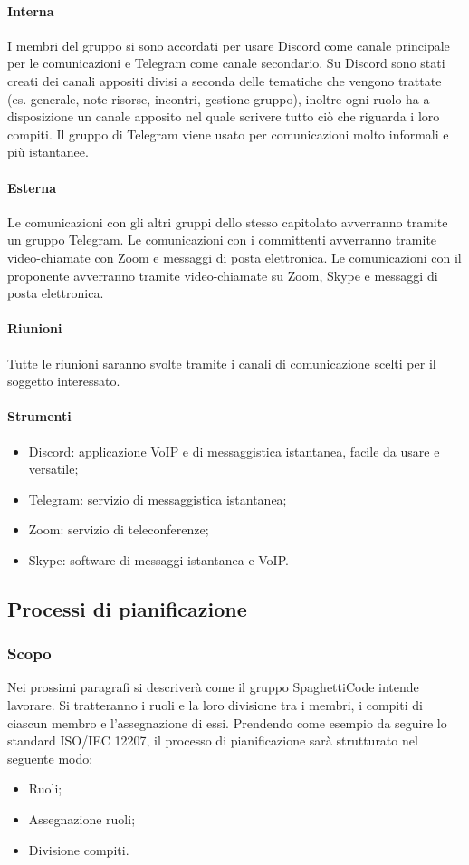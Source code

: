 \documentclass[../norme-di-progetto.tex]{subfiles}
\begin{document}
        \paragraph{Interna}
        I membri del gruppo si sono accordati per usare Discord come canale principale per le comunicazioni e Telegram come canale secondario. Su Discord sono stati creati dei canali appositi divisi a seconda delle tematiche che vengono trattate (es. generale, note-risorse, incontri, gestione-gruppo), inoltre ogni ruolo ha a disposizione un canale apposito nel quale scrivere tutto ciò che riguarda i loro compiti. Il gruppo di Telegram viene usato per comunicazioni molto informali e più istantanee.
        \paragraph{Esterna}
        Le comunicazioni con gli altri gruppi dello stesso capitolato avverranno tramite un gruppo Telegram.
        Le comunicazioni con i committenti avverranno tramite video-chiamate con Zoom e messaggi di posta elettronica.
        Le comunicazioni con il proponente avverranno tramite video-chiamate su Zoom, Skype e messaggi di posta elettronica.
        \paragraph{Riunioni}
        Tutte le riunioni saranno svolte tramite i canali di comunicazione scelti per il soggetto interessato. 
        \paragraph{Strumenti}
        \begin{itemize}
            \item Discord: applicazione VoIP e di messaggistica istantanea, facile da usare e versatile;
            \item Telegram: servizio di messaggistica istantanea;
            \item Zoom: servizio di teleconferenze;
            \item Skype: software di messaggi istantanea e VoIP.
        \end{itemize}

\subsection{Processi di pianificazione}
    \subsubsection{Scopo}
    Nei prossimi paragrafi si descriverà come il gruppo SpaghettiCode intende lavorare. Si tratteranno i ruoli e la loro divisione tra i membri, i compiti di ciascun membro e l'assegnazione di essi. Prendendo come esempio da seguire lo standard ISO/IEC 12207, il processo di pianificazione sarà strutturato nel seguente modo:
    \begin{itemize}
        \item Ruoli;
        \item Assegnazione ruoli;
        \item Divisione compiti.
    \end{itemize}
\end{document}
